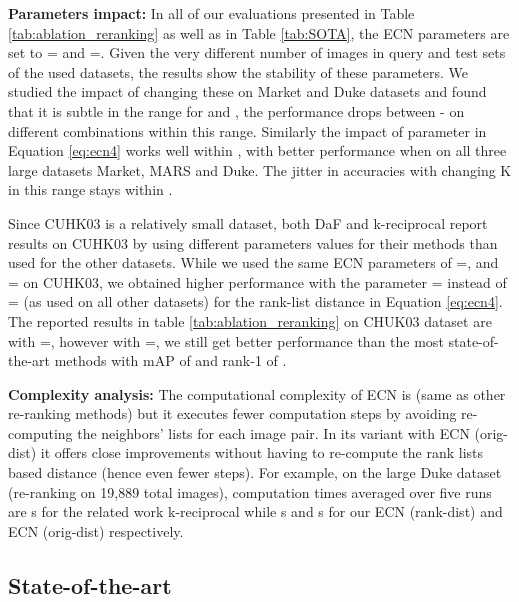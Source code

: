 \documentclass[10pt,twocolumn,letterpaper]{article}
\begin{document}
\noindent\textbf{Parameters impact:} In all of our evaluations presented in Table \ref{tab:ablation_reranking} as well as in Table \ref{tab:SOTA}, the ECN parameters are set to = and =.  Given the very different number of images in query and test sets of the used datasets, the results show the stability of these parameters. We studied the impact of changing these on Market and Duke datasets and found that it is subtle in the range for  and , the performance drops between - on different combinations within this range. Similarly the impact of parameter  in Equation \ref{eq:ecn4} works well within , with better performance when  on all three large datasets Market, MARS and Duke. The jitter in accuracies with changing K in this range stays within . 

Since CUHK03 is a relatively small dataset, both DaF \cite{yu2017divide} and k-reciprocal \cite{zhong2017re} report results on CUHK03 by using different parameters values for their methods than used for the other datasets. While we used the same ECN parameters of =, and = on CUHK03, we obtained higher performance with the parameter = instead of = (as used on all other datasets) for the rank-list distance in Equation \ref{eq:ecn4}. The reported results in table \ref{tab:ablation_reranking} on CHUK03 dataset are with =, however with =, we still get better performance than the most state-of-the-art methods with mAP of  and rank-1 of .  

\noindent\textbf{Complexity analysis:} The computational complexity of ECN is  (same as other re-ranking methods) but it executes fewer computation steps by avoiding re-computing the neighbors' lists for each image pair. In its variant with ECN (orig-dist) it offers close improvements without having to re-compute the rank lists based distance (hence even fewer steps). For example, on the large Duke dataset (re-ranking on 19,889 total images), computation times averaged over five runs are s for the related work k-reciprocal \cite{zhong2017re} while s and s for our ECN (rank-dist) and ECN (orig-dist) respectively.



\subsection{State-of-the-art}
\label{sec:eval-sota}
\end{document}
